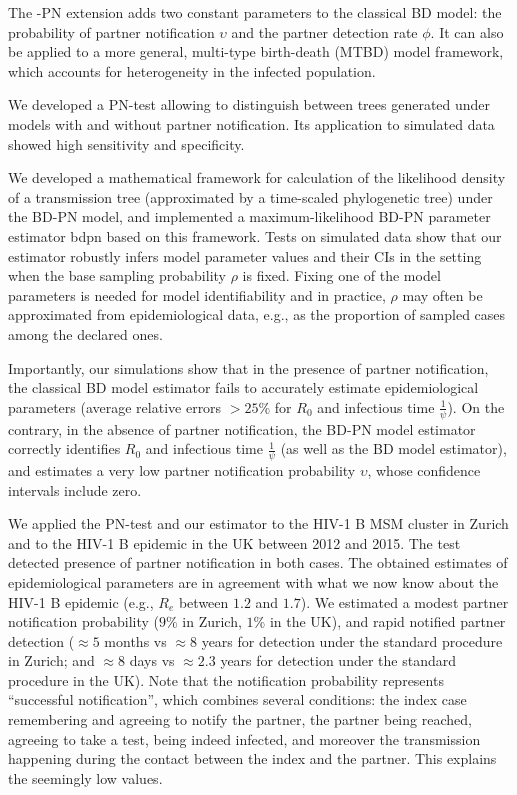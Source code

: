 \documentclass[10pt,letterpaper]{article}
\begin{document}
The -PN extension adds two constant parameters to the classical BD model: the probability of partner notification $\upsilon$ and the partner detection rate $\phi$. It can also be applied to a more general, multi-type birth-death (MTBD) model framework, which accounts for heterogeneity in the infected population. 

We developed a PN-test allowing to distinguish between trees generated under models with and without partner notification. Its application to simulated data showed high sensitivity and specificity. 

We developed a mathematical framework for calculation of the likelihood density of a transmission tree (approximated by a time-scaled phylogenetic tree) under the BD-PN model, and implemented a maximum-likelihood BD-PN parameter estimator bdpn based on this framework. %
Tests on simulated data show that our estimator robustly infers model parameter values and their CIs in the setting when %
the base sampling probability $\rho$ is fixed. Fixing one of the model parameters is needed for model identifiability and in practice, $\rho$ may often be approximated from epidemiological data, e.g., as the proportion of sampled cases among the declared ones. 

Importantly, our simulations show that in the presence of partner notification, the classical BD model estimator fails to accurately estimate epidemiological parameters (average relative errors $> 25\%$ for $R_0$ and infectious time $\frac{1}{\psi}$). On the contrary, in the absence of partner notification, the BD-PN model estimator correctly identifies $R_0$ and infectious time $\frac{1}{\psi}$ (as well as the BD model estimator), and estimates a very low partner notification probability $\upsilon$, whose confidence intervals include zero.

We applied the PN-test and our estimator to the HIV-1 B MSM cluster in Zurich and to the HIV-1 B epidemic in the UK between 2012 and 2015. The test detected presence of partner notification in both cases. The obtained estimates of epidemiological parameters are in agreement with what we now know about the HIV-1 B epidemic (e.g., $R_e$ between $1.2$ and $1.7$). We estimated a modest partner notification probability ($9\%$ in Zurich, $1\%$ in the UK), and rapid notified partner detection ($\approx 5$ months vs $\approx  8$ years for detection under the standard procedure in Zurich; and $\approx 8$ days vs $\approx 2.3$ years for detection under the standard procedure in the UK). Note that the notification probability represents ``successful notification'', which combines several conditions: the index case remembering and agreeing to notify the partner, the partner being reached, agreeing to take a test, being indeed infected, and moreover the transmission happening during the contact between the index and the partner. This explains the seemingly low values.
\end{document}
